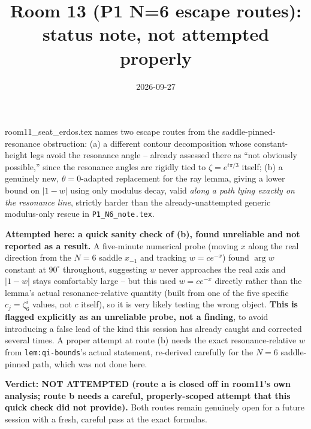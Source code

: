 \documentclass[11pt]{article}
\title{Room 13 (P1 N=6 escape routes): status note, not attempted properly}
\date{2026-09-27}
\begin{document}
\maketitle

room11\_seat\_erdos.tex names two escape routes from the saddle-pinned-resonance obstruction:
(a) a different contour decomposition whose constant-height legs avoid the resonance angle --
already assessed there as ``not obviously possible,'' since the resonance angles are rigidly tied
to $\zeta=e^{i\pi/3}$ itself; (b) a genuinely new, $\theta=0$-adapted replacement for the ray
lemma, giving a lower bound on $|1-w|$ using only modulus decay, valid \emph{along a path lying
exactly on the resonance line}, strictly harder than the already-unattempted generic modulus-only
rescue in \texttt{P1\_N6\_note.tex}.

\textbf{Attempted here: a quick sanity check of (b), found unreliable and not reported as a
result.} A five-minute numerical probe (moving $x$ along the real direction from the $N=6$ saddle
$x_{-1}$ and tracking $w=ce^{-x}$) found $\arg w$ constant at $90^\circ$ throughout, suggesting $w$
never approaches the real axis and $|1-w|$ stays comfortably large -- but this used $w=ce^{-x}$
directly rather than the lemma's actual resonance-relative quantity (built from one of the five
specific $c_j=\zeta_6^i$ values, not $c$ itself), so it is very likely testing the wrong object.
\textbf{This is flagged explicitly as an unreliable probe, not a finding}, to avoid introducing a
false lead of the kind this session has already caught and corrected several times. A proper
attempt at route (b) needs the exact resonance-relative $w$ from \texttt{lem:qi-bounds}'s actual
statement, re-derived carefully for the $N=6$ saddle-pinned path, which was not done here.

\textbf{Verdict: NOT ATTEMPTED (route a is closed off in room11's own analysis; route b needs a
careful, properly-scoped attempt that this quick check did not provide).} Both routes remain
genuinely open for a future session with a fresh, careful pass at the exact formulas.
\end{document}

